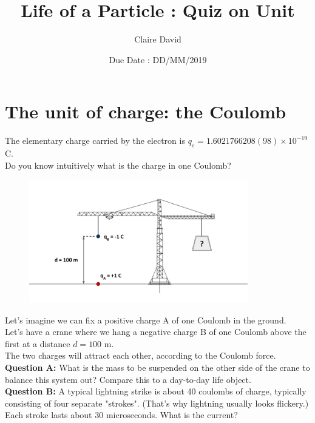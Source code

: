 \documentclass[12pt]{article}
\title{Life of a Particle : Quiz on Unit}
\author{Claire David}
\date{Due Date : DD/MM/2019}
\begin{document}
\maketitle


\section{The unit of charge: the Coulomb}
The elementary charge carried by the electron is $q_e = 1.6021766208(98) \times 10^{-19}$ C.\\
Do you know intuitively what is the charge in one Coulomb?

\begin{figure}[h]
    \centering
    \includegraphics[width=0.85\textwidth]{Coulomb_quiz.png}
\end{figure}
Let's imagine we can fix a positive charge A of one Coulomb in the ground.\\
Let's have a crane where we hang a negative charge B of one Coulomb above the first at a distance $d = 100$ m.\\
The two charges will attract each other, according to the Coulomb force.\\


\textbf{Question A:} What is the mass to be suspended on the other side of the crane to balance this system out? Compare this to a day-to-day life object.\\



\textbf{Question B:} A typical lightning strike is about 40 coulombs of charge, typically consisting of four separate "strokes". (That's why lightning usually looks flickery.) Each stroke lasts about 30 microseconds. What is the current?\\
\end{document}
